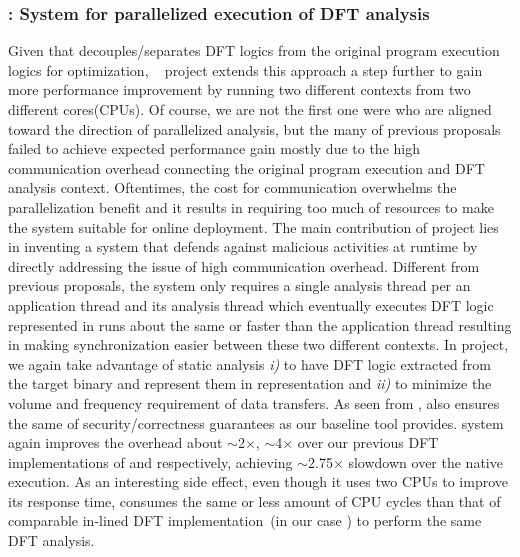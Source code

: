 \documentclass[letterpaper, 10pt]{article}
\begin{document}
\begin{small}
\subsubsection*{\SR: System for parallelized execution of DFT analysis} 
%
Given that \TFA decouples/separates DFT logics from the original program
execution logics for optimization, \SR~\cite{sreplica:2013ccs} project extends
this approach a step further to gain more performance improvement by running
two different contexts from two different cores(CPUs). 
%
Of course, we are not the first one were who are aligned toward the direction
of parallelized analysis, but the many of previous proposals failed to achieve
expected performance gain mostly due to the high communication overhead
connecting the original program execution and DFT analysis context.
Oftentimes, the cost for communication overwhelms the parallelization benefit
and it results in requiring too much of resources to make the system suitable
for online deployment. 
%
The main contribution of \SR project lies in inventing a system that defends
against malicious activities at runtime by directly addressing the issue of
high communication overhead. Different from previous proposals, the system only
requires a single analysis thread per an application thread and its analysis
thread which eventually executes DFT logic represented in \TFA runs about the
same or faster than the application thread resulting in making synchronization
easier between these two different contexts.
%
In \SR project, we again take advantage of static analysis  {\it i)} to have
DFT logic extracted from the target binary and represent them in \TFA
representation and {\it ii)} to minimize the volume and frequency requirement
of data transfers. As seen from \TFA, \SR also ensures the same of
security/correctness guarantees as our baseline tool provides.
%
\SR system again improves the overhead about $\sim$2$\times$, $\sim$4$\times$
over our previous DFT implementations of \TFA and \libdft respectively,
achieving $\sim$2.75$\times$ slowdown over the native execution.
%
As an interesting side effect, even though it uses two CPUs to improve its
response time, \SR consumes the same or less amount of CPU cycles than that of
comparable in-lined DFT implementation~(in our case \TFA) to perform the same
DFT analysis. 


\end{small}
\end{document}
